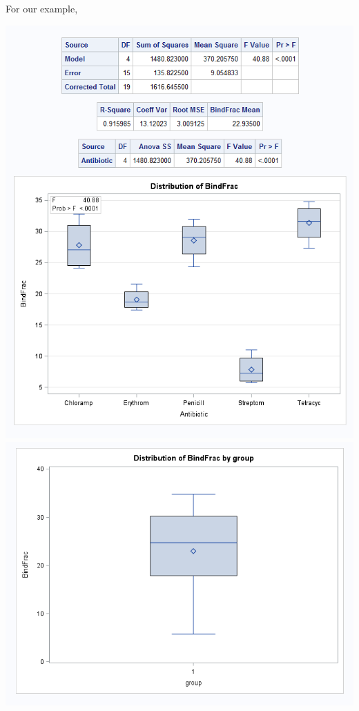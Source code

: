 For our example, 
\begin{center}
\includegraphics[scale=0.5]{BindFracANOVA}\includegraphics[scale=0.4]{BindFracBoxplot}
\end{center}

